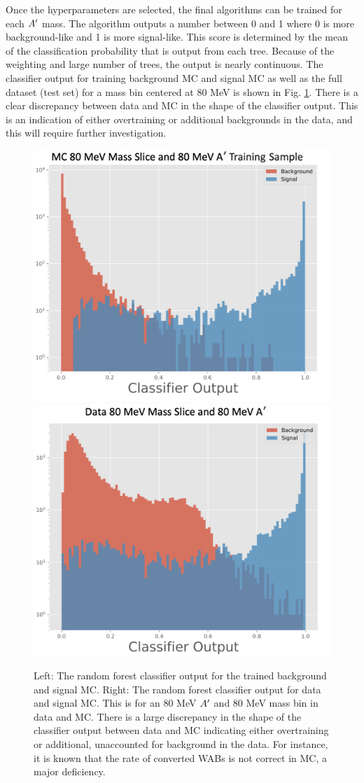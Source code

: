 Once the hyperparameters are selected, the final algorithms can be trained for each $A^\prime$ mass. The algorithm outputs a number between 0 and 1 where 0 is more background-like and 1 is more signal-like. This score is determined by the mean of the classification probability that is output from each tree. Because of the weighting and large number of trees, the output is nearly continuous. The classifier output for training background MC and signal MC as well as the full dataset (test set) for a mass bin centered at 80 MeV is shown in Fig. \ref{fig:clf}. There is a clear discrepancy between data and MC in the shape of the classifier output. This is an indication of either overtraining or additional backgrounds in the data, and this will require further investigation.

\begin{figure}[t]
    \centering
    \includegraphics[width=.45\textwidth]{figs/Results/clf_train.png}
    \includegraphics[width=.45\textwidth]{figs/Results/clf_test.png}
    \caption{Left: The random forest classifier output for the trained background and signal MC. Right: The random forest classifier output for data and signal MC. This is for an 80 MeV $A^\prime$ and 80 MeV mass bin in data and MC. There is a large discrepancy in the shape of the classifier output between data and MC indicating either overtraining or additional, unaccounted for background in the data. For instance, it is known that the rate of converted WABs is not correct in MC, a major deficiency.}
    \label{fig:clf}
\end{figure}

